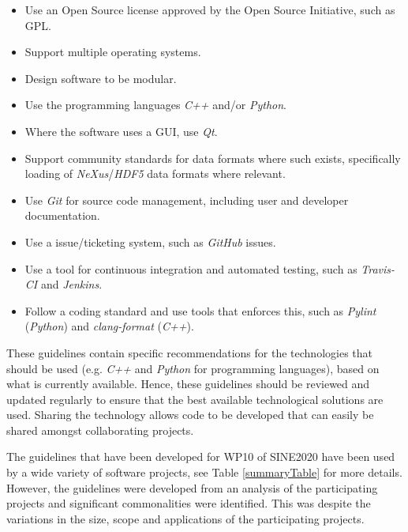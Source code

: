\documentclass[jnr]{iosart2x}
\begin{document}
\begin{itemize}
      \item Use an Open Source license approved by the Open Source Initiative, such as GPL.
      \item Support multiple operating systems.
      \item Design software to be modular.
      \item Use the programming languages {\it C++} and/or {\it Python}.
      \item Where the software uses a GUI, use {\it Qt}.
      \item Support community standards for data formats where such exists, specifically loading of {\it NeXus}/{\it HDF5} data formats where relevant.
      \item Use {\it Git} for source code management, including user and developer documentation.
      \item Use a issue/ticketing system, such as {\it GitHub} issues.
      \item Use a tool for continuous integration and automated testing, such as {\it Travis-CI} and {\it Jenkins}.
      \item Follow a coding standard and use tools that enforces this, such as {\it Pylint} ({\it Python}) and {\it clang-format} ({\it C++}).
\end{itemize}

These guidelines contain specific recommendations for the technologies that should be used (e.g. {\it C++} and {\it Python} for programming languages), based on what is currently available.
Hence, these guidelines should be reviewed and updated regularly to ensure that the best available technological solutions are used.
Sharing the technology allows code to be developed that can easily be shared amongst collaborating projects.

The guidelines that have been developed for WP10 of SINE2020 have been used by a wide variety of software projects, see Table \ref{summaryTable} for more details.
However, the guidelines were developed from an analysis of the participating projects and significant commonalities were identified.
This was despite the variations in the size, scope and applications of the participating projects.
\end{document}
